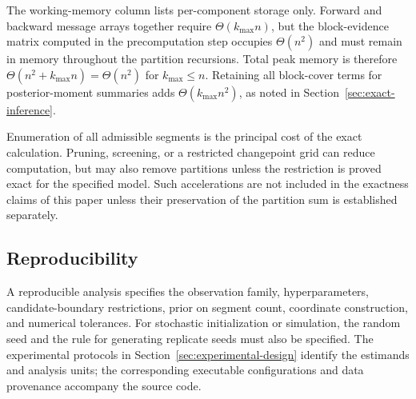 The working-memory column lists per-component storage only. Forward and backward message arrays together require $\Theta(k_{\max}n)$, but the block-evidence matrix computed in the precomputation step occupies $\Theta(n^2)$ and must remain in memory throughout the partition recursions. Total peak memory is therefore $\Theta(n^2+k_{\max}n)=\Theta(n^2)$ for $k_{\max}\le n$. Retaining all block-cover terms for posterior-moment summaries adds $\Theta(k_{\max}n^2)$, as noted in Section~\ref{sec:exact-inference}.

Enumeration of all admissible segments is the principal cost of the exact calculation. Pruning, screening, or a restricted changepoint grid can reduce computation, but may also remove partitions unless the restriction is proved exact for the specified model. Such accelerations are not included in the exactness claims of this paper unless their preservation of the partition sum is established separately.

\subsection{Reproducibility}
A reproducible analysis specifies the observation family, hyperparameters, candidate-boundary restrictions, prior on segment count, coordinate construction, and numerical tolerances. For stochastic initialization or simulation, the random seed and the rule for generating replicate seeds must also be specified. The experimental protocols in Section~\ref{sec:experimental-design} identify the estimands and analysis units; the corresponding executable configurations and data provenance accompany the source code.
